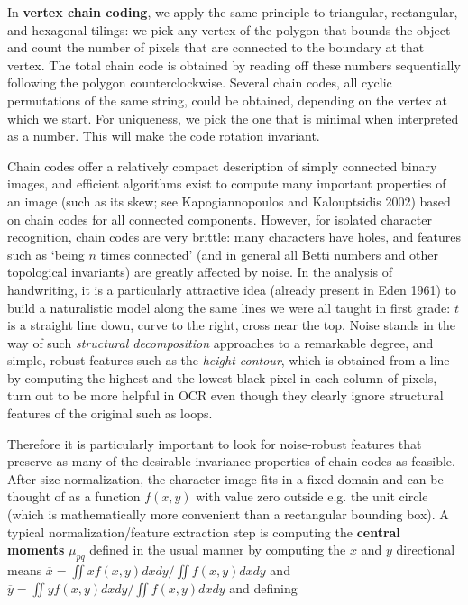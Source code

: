 In {\bf vertex chain coding}, we apply the same
principle to triangular, rectangular, and hexagonal tilings: we pick any
vertex of the polygon that bounds the object and count the number of pixels
that are connected to the boundary at that vertex. The total chain code is
obtained by reading off these numbers sequentially following the polygon
counterclockwise. Several chain codes, all cyclic permutations of the same
string, could be obtained, depending on the vertex at which we start. For
uniqueness, we pick the one that is minimal when interpreted as a number. This
will make the code rotation invariant.

Chain codes offer a relatively compact description of simply connected binary
images, and efficient algorithms exist to compute many important properties of
an image (such as its skew; see Kapogiannopoulos and Kalouptsidis 2002) based
on\nocite{Kapogiannopoul:2002} chain codes for all connected components.
However, for isolated character recognition, chain codes are very brittle:
many characters have holes, and features such as `being $n$ times connected'
(and in general all Betti numbers and other topological invariants) are
greatly affected by noise. In the analysis of handwriting, it is a
particularly attractive idea (already present in Eden 1961) to build a
naturalistic model along the same lines we were all taught in first grade: $t$
is a straight line down, curve to the right, cross near the top.  Noise stands
in the way of such {\it structural decomposition} approaches to a remarkable degree, and simple, robust
features such as the {\it height contour}, which is obtained from a line by
computing the highest and the lowest black pixel in each column of pixels,
turn out to be more helpful in OCR even though they clearly ignore structural
features of the original such as loops.

Therefore it is particularly important to look for noise-robust features that
preserve as many of the desirable invariance properties of chain codes as
feasible. After size normalization, the character image fits in a fixed domain
and can be thought of as a function $f(x,y)$ with value zero outside e.g. the
unit circle (which is mathematically more convenient than a rectangular
bounding box).  A typical normalization/feature extraction step is computing
the {\bf central moments} $\mu_{pq}$ defined in
the usual manner by computing the $x$ and $y$ directional means $\overline{x}
= \iint x f(x,y) dx dy/\iint f(x,y) dx dy$ and $\overline{y} = \iint y f(x,y)
dx dy/\iint f(x,y) dx dy$ and defining

